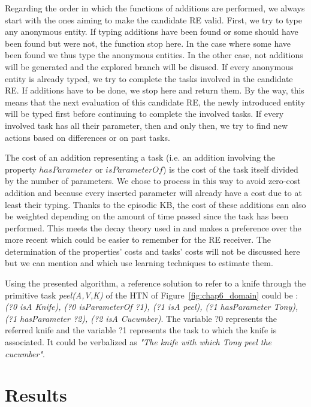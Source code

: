 Regarding the order in which the functions of additions are performed, we always start with the ones aiming to make the candidate RE valid. First, we try to type any anonymous entity. If typing additions have been found or some should have been found but were not, the function stop here. In the case where some have been found we thus type the anonymous entities. In the other case, not additions will be generated and the explored branch will be disused. If every anonymous entity is already typed, we try to complete the tasks involved in the candidate RE. If additions have to be done, we stop here and return them. By the way, this means that the next evaluation of this candidate RE, the newly introduced entity will be typed first before continuing to complete the involved tasks. If every involved task has all their parameter, then and only then, we try to find new actions based on differences or on past tasks.

The cost of an addition representing a task (i.e. an addition involving the property $hasParameter$ or $isParameterOf$) is the cost of the task itself divided by the number of parameters. We chose to process in this way to avoid zero-cost addition and because every inserted parameter will already have a cost due to at least their typing. Thanks to the episodic KB, the cost of these additions can also be weighted depending on the amount of time passed since the task has been performed. This meets the decay theory used in \cite{williams_2020_toward} and makes a preference over the more recent which could be easier to remember for the RE receiver. The determination of the properties' costs and tasks' costs will not be discussed here but we can mention \cite{belke_2002_tracking} and \cite{koolen_2012_learning} which use learning techniques to estimate them.

Using the presented algorithm, a reference solution to refer to a knife through the primitive task \textit{peel(A,V,K)} of the HTN of Figure~\ref{fig:chap6_domain} could be : \textit{(?0 isA Knife), (?0 isParameterOf ?1), (?1 isA peel), (?1 hasParameter Tony), (?1 hasParameter ?2), (?2 isA Cucumber)}. The variable ?0 represents the referred knife and the variable ?1 represents the task to which the knife is associated. It could be verbalized as \textit{"The knife with which Tony peel the cucumber"}.

\section{Results}

